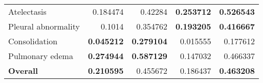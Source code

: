 \documentclass[journal,twoside,web, 11pt]{ieeecolor}
\begin{document}
\begin{table*}[]
\begin{tabular}{lrrrr}
Atelectasis                 & 0.184474                                                                                        & 0.42284                                                                                         & \textbf{0.253712}                                                                               & \textbf{0.526543}                                                                               \\
Pleural abnormality         & 0.1014                                                                                          & 0.354762                                                                                        & \textbf{0.193205}                                                                               & \textbf{0.416667}                                                                               \\
Consolidation               & \textbf{0.045212}                                                                               & \textbf{0.279104}                                                                               & 0.015555                                                                                        & 0.177612                                                                                        \\
Pulmonary edema             & \textbf{0.274944}                                                                               & \textbf{0.587129}                                                                               & 0.147032                                                                                        & 0.466337                                                                                        \\ \hline
\textbf{Overall}            & \textbf{0.210595}                                                                               & 0.455672                                                                                        & 0.186437                                                                                        & \textbf{0.463208}                                                                               \\ \hline
\end{tabular}
\end{table*}
\end{document}
